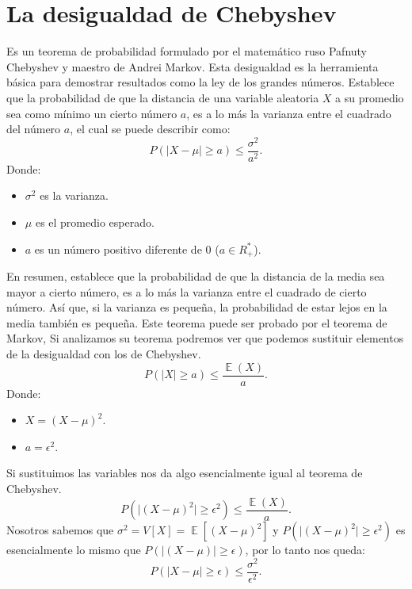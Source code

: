 \documentclass[]{article}
\DeclareMathOperator{\EX}{\mathbb{E}}%
\begin{document}
\section{La desigualdad de Chebyshev}
Es un teorema de probabilidad formulado por el matemático ruso Pafnuty Chebyshev y maestro de Andrei Markov.
Esta desigualdad es la herramienta básica para demostrar resultados como la ley de los grandes números.
Establece que la probabilidad de que la distancia de una variable aleatoria $X$ a su promedio sea como mínimo un cierto número $a$, es a lo más la varianza entre el cuadrado del número $a$, el cual se puede describir como:
\[ P(\lvert X - \mu \lvert \geq a) \leq \frac{\sigma^{2}}{a^{2}}.\]
Donde:
\begin{itemize}
	\item $\sigma^{2}$ es la varianza.
	\item $\mu$ es el promedio esperado.
	\item $a$ es un número positivo diferente de 0 ($a \in R_{+}^{*}$).
\end{itemize}
En resumen, establece que la probabilidad de que la distancia de la media sea mayor a cierto número, es a lo más la varianza entre el cuadrado de cierto número.
Así que, si la varianza es pequeña, la probabilidad de estar lejos en la media también es pequeña.
Este teorema puede ser probado por el teorema de Markov, Si analizamos su teorema podremos ver que podemos sustituir elementos de la desigualdad con los de Chebyshev.
\[ P(\lvert X \lvert \geq a) \leq \frac{\EX(X)}{a}.  \]
Donde:
\begin{itemize}
	\item $X = (X - \mu)^{2}$.
	\item $a = \epsilon^{2}$.
\end{itemize}

Si sustituimos las variables nos da algo esencialmente igual al teorema de Chebyshev.
\[ P(\lvert (X-\mu)^{2} \lvert \geq \epsilon^{2}) \leq \frac{\EX(X)}{a}.\]
Nosotros sabemos que $\sigma^{2} = V[X] =\EX[(X-\mu)^{2}]$ y $P(\lvert (X-\mu)^{2} \lvert \geq \epsilon^{2})$ es esencialmente lo mismo que $P(\lvert (X-\mu) \lvert \geq \epsilon)$, por lo tanto nos queda:
\[ P(\lvert X-\mu \lvert \geq \epsilon) \leq \frac{\sigma^{2}}{\epsilon^{2}}.  \]
\end{document}
